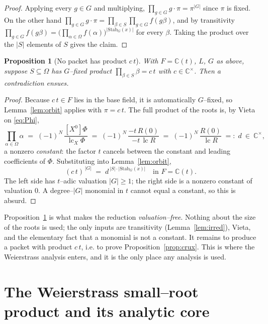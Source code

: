 \documentclass[11pt,reqno]{amsart}
\theoremstyle{plain}
\newtheorem{proposition}[theorem]{Proposition}
\theoremstyle{definition}
\newcommand{\C}{\mathbb{C}}
\DeclareMathOperator{\lc}{lc}
\begin{document}
\begin{proof}
Applying every $g\in G$ and multiplying, $\prod_{g\in G} g\!\cdot\!\pi=\pi^{|G|}$ since $\pi$ is fixed.
On the other hand $\prod_{g\in G} g\!\cdot\!\pi=\prod_{\beta\in S}\prod_{g\in G} f(g\beta)$, and by
transitivity $\prod_{g\in G} f(g\beta)=\big(\prod_{\alpha\in\Omega}f(\alpha)\big)^{|\mathrm{Stab}_G(x)|}$
for every $\beta$. Taking the product over the $|S|$ elements of $S$ gives the claim.
\end{proof}

\begin{proposition}[No packet has product $c\,t$]\label{prop:no-ct}
With $F=\C(t)$, $L$, $G$ as above, suppose $S\subseteq\Omega$ has $G$--fixed product
$\prod_{\beta\in S}\beta=c\,t$ with $c\in\C^\times$. Then a contradiction ensues.
\end{proposition}

\begin{proof}
Because $c\,t\in F$ lies in the base field, it is automatically $G$--fixed, so Lemma~\ref{lem:orbit}
applies with $\pi=c\,t$. The full product of the roots is, by Vieta on \eqref{eq:Phi},
\[
  \prod_{\alpha\in\Omega}\alpha \;=\; (-1)^{N}\,\frac{[X^0]\Phi}{\lc_X\Phi}
   \;=\;(-1)^{N}\,\frac{-t\,R(0)}{-t\,\lc R}
   \;=\;(-1)^{N}\,\frac{R(0)}{\lc R}\;=:\;d\ \in\ \C^\times,
\]
a nonzero \emph{constant}: the factor $t$ cancels between the constant and leading coefficients of
$\Phi$. Substituting into Lemma~\ref{lem:orbit},
\[
  (c\,t)^{\,|G|}\;=\;d^{\,|S|\cdot|\mathrm{Stab}_G(x)|}\quad\text{in }F=\C(t).
\]
The left side has $t$--adic valuation $|G|\ge1$; the right side is a nonzero constant of valuation $0$.
A degree--$|G|$ monomial in $t$ cannot equal a constant, so this is absurd.
\end{proof}

Proposition~\ref{prop:no-ct} is what makes the reduction \emph{valuation--free}. Nothing about the size
of the roots is used; the only inputs are transitivity (Lemma~\ref{lem:irred}), Vieta, and the
elementary fact that a monomial is not a constant. It remains to produce a packet with product $c\,t$,
i.e. to prove Proposition~\ref{prop:crux}. This is where the Weierstrass analysis enters, and it is the
only place any analysis is used.

\section{The Weierstrass small--root product and its analytic core}\label{sec:analytic}
\end{document}

